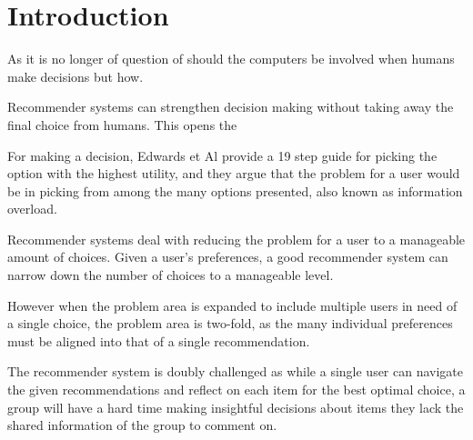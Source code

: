 \section{Introduction}
As it is no longer of question of should the computers be involved when humans make decisions but how.

Recommender systems can strengthen decision making without taking away the final choice from humans. This opens the 

For making a decision, Edwards et Al provide a 19 step guide for picking the option with the highest utility, and they argue that the problem for a user would be in picking from among the many options presented, also known as information overload.\cite{Edwards2001}

Recommender systems deal with reducing the problem for a user to a manageable amount of choices. Given a user's preferences, a good recommender system can narrow down the number of choices to a manageable level.

However when the problem area is expanded to include multiple users in need of a single choice, the problem area is two-fold, as the many individual preferences must be aligned into that of a single recommendation.

The recommender system is doubly challenged as while a single user can navigate the given recommendations and reflect on each item for the best optimal choice, a group will have a hard time making insightful decisions about items they lack the shared information of the group to comment on.
